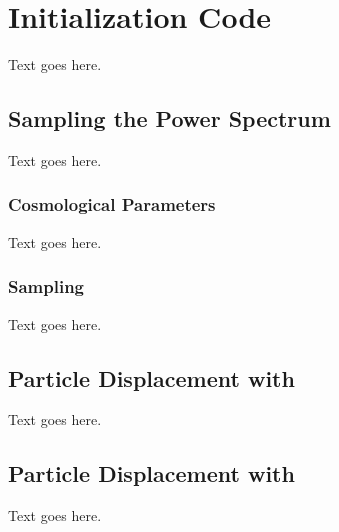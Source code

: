 
%
%

\section{Initialization Code}
\label{sec:initialization}



Text goes here.




\subsection{Sampling the Power Spectrum}
\label{subsec:initializtion--sampling}


Text goes here.



\subsubsection{Cosmological Parameters}
\label{subsubsec:initialization--sampling--cosmological_parameters}


Text goes here.



\subsubsection{Sampling}
\label{subsubsec:initialization--sampling--sampling}


Text goes here.




\subsection{Particle Displacement with \za}
\label{subsec:initialization--za_displacement}


Text goes here.




\subsection{Particle Displacement with \lpt}
\label{subsec:initialization--2lpt_displacement}


Text goes here.





